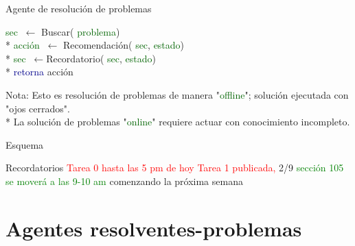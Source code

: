 \documentclass{beamer}
\theoremstyle{definition}
\theoremstyle{theorem}
\theoremstyle{remark}
\begin{document}
\begin{frame}{Agente de resolución de problemas}
\begin{theorem}[Pseudocódigo]
\begin{listing}
{                \quad\quad\quad\quad
                \textcolor{darkgreen}{sec} $\ \leftarrow $ Buscar(
                \textcolor{darkgreen}{problema})\\*
                \quad\quad
                \textcolor{darkgreen}{acción} $\ \leftarrow $ Recomendación(
                \textcolor{darkgreen}{sec}, 
                \textcolor{darkgreen}{estado})\\*
                \quad\quad
                \textcolor{darkgreen}{sec} $\ \leftarrow $Recordatorio(
                \textcolor{darkgreen}{sec}, 
                \textcolor{darkgreen}{estado})\\*
                \quad\quad
                \textcolor{darkblue}{retorna} acción
            }
        \end{listing}
        
    \end{theorem}
    
    {\tiny 
        \quad\quad\quad Nota: Esto es resolución de problemas de manera "\textcolor{darkgreen}{offline}"; solución ejecutada con "ojos cerrados".
        \\*\quad\quad\quad
        La solución de problemas 
        "\textcolor{darkgreen}{online}" requiere actuar con conocimiento incompleto.}
    
\end{frame}


\begin{frame}{Esquema}
    \tableofcontents%
     
\end{frame}


\begin{frame}{Recordatorios}
    \textcolor{red}{Tarea 0 hasta las 5 pm de hoy} \newline
    \textcolor{red}{Tarea 1 publicada,} 2/9 \newline
    \textcolor{Green}{sección 105 se moverá a las 9-10 am} comenzando la próxima semana
\end{frame}

\section{Agentes resolventes-problemas}%
\end{document}
